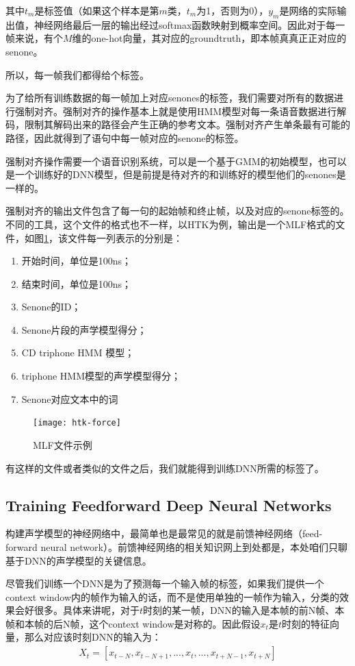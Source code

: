 其中$t_m$是标签值（如果这个样本是第$m$类，$t_m$为1，否则为0），$y_m$是网络的实际输出值，神经网络最后一层的输出经过softmax函数映射到概率空间。因此对于每一帧来说，有个$M$维的one-hot向量，其对应的groundtruth，即本帧真真正正对应的senone。

所以，每一帧我们都得给个标签。

为了给所有训练数据的每一帧加上对应senones的标签，我们需要对所有的数据进行强制对齐。强制对齐的操作基本上就是使用HMM模型对每一条语音数据进行解码，限制其解码出来的路径会产生正确的参考文本。强制对齐产生单条最有可能的路径，因此就得到了语句中每一帧对应的senone的标签。

强制对齐操作需要一个语音识别系统，可以是一个基于GMM的初始模型，也可以是一个训练好的DNN模型，但是前提是待对齐的和训练好的模型他们的senones是一样的。

强制对齐的输出文件包含了每一句的起始帧和终止帧，以及对应的senone标签的。不同的工具，这个文件的格式也不一样，以HTK为例，输出是一个MLF格式的文件，如图\ref{fig:htk-force}，该文件每一列表示的分别是：
\begin{enumerate}
	\item 开始时间，单位是100ns；
	\item 结束时间，单位是100ns；
	\item Senone的ID；
	\item Senone片段的声学模型得分；
	\item CD triphone HMM 模型；
	\item triphone HMM模型的声学模型得分；
	\item Senone对应文本中的词
\end{enumerate}

\begin{figure}[htbp]
	\centering
	\texttt{[image: htk-force]}
	\caption{MLF文件示例\label{fig:htk-force}}
\end{figure}

有这样的文件或者类似的文件之后，我们就能得到训练DNN所需的标签了。

\subsection{Training Feedforward Deep Neural Networks} 
构建声学模型的神经网络中，最简单也是最常见的就是前馈神经网络（feed-forward neural network）。前馈神经网络的相关知识网上到处都是，本处咱们只聊基于DNN的声学模型的关键信息。

尽管我们训练一个DNN是为了预测每一个输入帧的标签，如果我们提供一个context window内的帧作为输入的话，而不是使用单独的一帧作为输入，分类的效果会好很多。具体来讲呢，对于$t$时刻的某一帧，DNN的输入是本帧的前N帧、本帧和本帧的后N帧，这个context window是对称的。因此假设$x_t$是$t$时刻的特征向量，那么对应该时刻DNN的输入为：
\begin{align} 
	X_{t} = [x_{t-N}, x_{t-N+1}, ..., x_{t}, ..., x_{t+N-1}, x_{t+N}]
\end{align}

